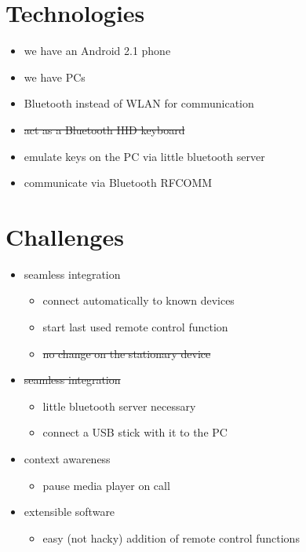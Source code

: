 \documentclass[ddc nogerman]{tudbeamer}
\begin{document}
\section{Technologies}
\begin{frame}
    \begin{itemize}
        \item we have an Android 2.1 phone
        \item we have PCs
        \item Bluetooth instead of WLAN for communication
        \item\sout{act as a Bluetooth HID keyboard}
        \item emulate keys on the PC via little bluetooth server
        \item communicate via Bluetooth RFCOMM
    \end{itemize}
\end{frame}

\section{Challenges}
\begin{frame}
    \begin{itemize}
        \item seamless integration
        \begin{itemize}
            \item connect automatically to known devices
            \item start last used remote control function
            \item\sout{no change on the stationary device}
        \end{itemize}
        \item\sout{seamless integration}
        \begin{itemize}
            \item little bluetooth server necessary
            \item connect a USB stick with it to the PC
        \end{itemize}
        \item context awareness
        \begin{itemize}
            \item pause media player on call
        \end{itemize}
        \item extensible software
        \begin{itemize}
            \item easy (not hacky) addition of remote control functions
        \end{itemize}
    \end{itemize}
\end{frame}
\end{document}
